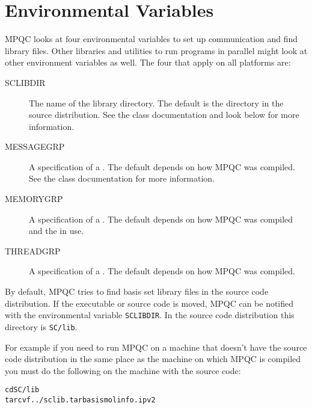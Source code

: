 \section{Environmental Variables}

MPQC looks at four environmental variables to set up
communication and find library files.  Other libraries
and utilities to run programs in parallel might look
at other environment variables as well.  The four that
apply on all platforms are:

\begin{description}
\item[{\ttfamily SCLIBDIR}] The name of the library directory.  The default
                      is the directory in the source distribution.  See the
                       class documentation and
                      look below for more information.
\item[{\ttfamily MESSAGEGRP}] A  specification of a
                       .
                      The default depends on how MPQC was compiled.  See
                      the  class documentation for
                      more information.
\item[{\ttfamily MEMORYGRP}] A  specification of a
                       .
                      The default depends on how MPQC was compiled and the
                       in use.
\item[{\ttfamily THREADGRP}] A  specification of a
                       .
                      The default depends on how MPQC was compiled.
\end{description}

By default, MPQC tries to find basis set library files in
the source code distribution.  If the executable or source
code is moved, MPQC can be notified with the environmental
variable \verb|SCLIBDIR|.  In the source code distribution
this directory is \verb|SC/lib|.

For example if you need to run MPQC on a machine that doesn't
have the source code distribution in the same place as the
machine on which MPQC is compiled you must do the following
on the machine with the source code:

\begin{alltt}
cd SC/lib
tar cvf ../sclib.tar basis molinfo.ipv2
\end{alltt}

